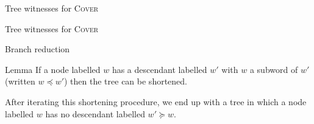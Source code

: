 \documentclass{beamer}
\newcommand{\COVER}{\textsc{Cover}\xspace}
\begin{document}

	

\begin{frame}{Tree witnesses for \COVER}
	
	\centering
	
	
\end{frame}

\begin{frame}{Tree witnesses for \COVER}
	\centering
	
	
\end{frame}

\begin{frame}{Branch reduction}
	
	\begin{block}{Lemma}
		If a node labelled $w$ has a descendant labelled $w'$ with $w$ a subword of $w'$ (written $w \preceq w'$) then the tree can be shortened.
	\end{block}
	\begin{center}
	
	\end{center}
	\pause \pause \pause
	\vspace{-1cm}
	
	After iterating this shortening procedure, we end up with a tree in which a node labelled $w$ has no descendant labelled $w' \succeq w$. 
\end{frame}
\end{document}
